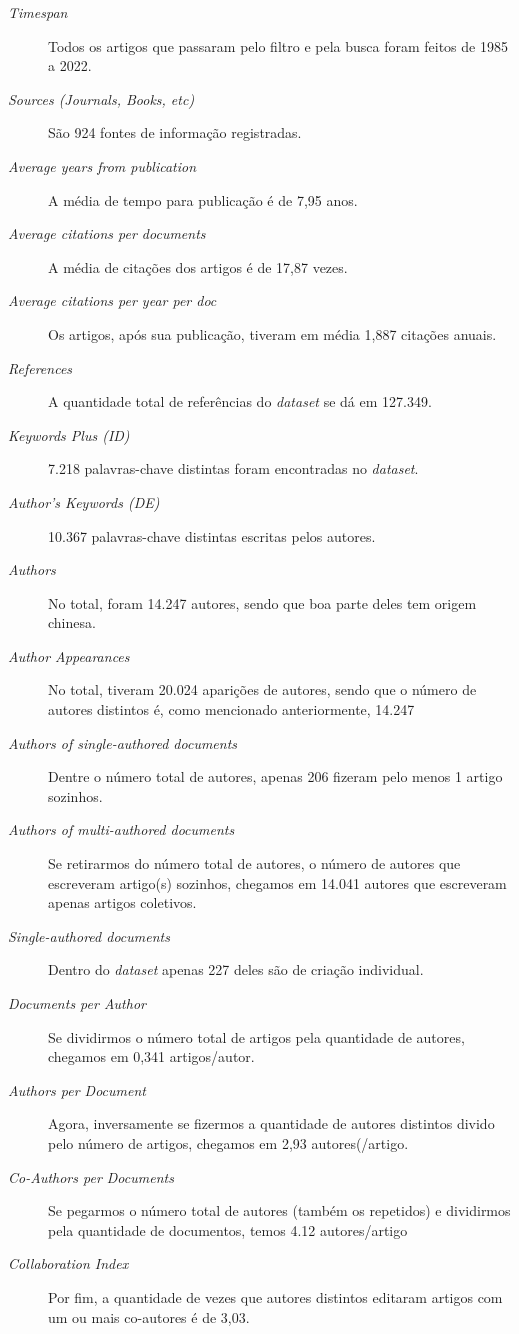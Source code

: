 \begin{description}
    \item [\textit{Timespan}] Todos os artigos que passaram pelo filtro e pela busca foram feitos de 1985 a 2022.
    \item [\textit{Sources (Journals, Books, etc)}] São 924 fontes de informação registradas.
    \item [\textit{Average years from publication}] A média de tempo para publicação é de 7,95 anos.
    \item [\textit{Average citations per documents}] A média de citações dos artigos é de 17,87 vezes.
    \item [\textit{Average citations per year per doc}] Os artigos, após sua publicação, tiveram em média 1,887 citações anuais.
    \item [\textit{References}] A quantidade total de referências do \emph{dataset} se dá em 127.349.
    \item [\textit{Keywords Plus (ID)}] 7.218 palavras-chave distintas foram encontradas no \emph{dataset}.
    \item [\textit{Author's Keywords (DE)}] 10.367 palavras-chave distintas escritas pelos autores.
    \item [\textit{Authors}] No total, foram 14.247 autores, sendo que boa parte deles tem origem chinesa.
    \item [\textit{Author Appearances}] No total, tiveram 20.024 aparições de autores, sendo que o número de autores distintos é, como mencionado anteriormente, 14.247
    \item [\textit{Authors of single-authored documents}] Dentre o número total de autores, apenas 206 fizeram pelo menos 1 artigo sozinhos.
    \item [\textit{Authors of multi-authored documents}] Se retirarmos do número total de autores, o número de autores que escreveram artigo(s) sozinhos, chegamos em 14.041 autores que escreveram apenas artigos coletivos.
    \item [\textit{Single-authored documents}] Dentro do \emph{dataset} apenas 227 deles são de criação individual.
    \item [\textit{Documents per Author}] Se dividirmos o número total de artigos pela quantidade de autores, chegamos em 0,341 artigos/autor.
    \item [\textit{Authors per Document}] Agora, inversamente se fizermos a quantidade de autores distintos divido pelo número de artigos, chegamos em 2,93 autores(/artigo.
    \item [\textit{Co-Authors per Documents}] Se pegarmos o número total de autores (também os repetidos) e dividirmos pela quantidade de documentos, temos 4.12 autores/artigo
    \item [\textit{Collaboration Index}] Por fim, a quantidade de vezes que autores distintos editaram artigos com um ou mais co-autores é de 3,03.
\end{description}
